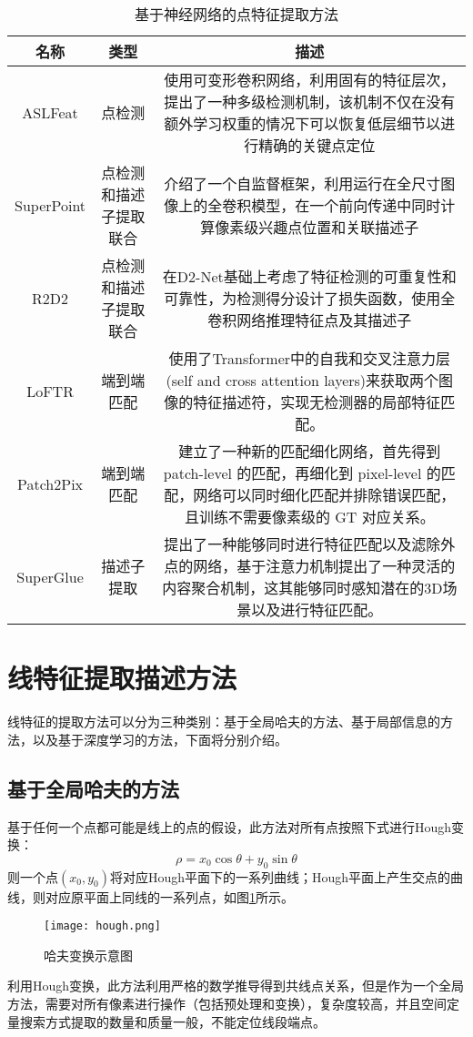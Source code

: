 \begin{table}[!ht]
  \centering
  \begin{tabular}{|c|c|c|}
  \hline
      名称 & 类型 & 描述 \\ \hline
      ASLFeat\cite{luo2020aslfeat} & 点检测 & \parbox[c][16ex]{7cm}{使用可变形卷积网络，利用固有的特征层次，提出了一种多级检测机制，该机制不仅在没有额外学习权重的情况下可以恢复低层细节以进行精确的关键点定位} \\ \hline
      SuperPoint\cite{detone2018superpoint} & 点检测和描述子提取联合 & \parbox[c][13ex]{7cm}{介绍了一个自监督框架，利用运行在全尺寸图像上的全卷积模型，在一个前向传递中同时计算像素级兴趣点位置和关联描述子} \\ \hline
      R2D2\cite{revaud2019r2d2} & 点检测和描述子提取联合 & \parbox[c][13ex]{7cm}{在D2-Net基础上考虑了特征检测的可重复性和可靠性，为检测得分设计了损失函数，使用全卷积网络推理特征点及其描述子} \\ \hline
      LoFTR\cite{sun2021loftr} & 端到端匹配 &\parbox[c][13ex]{7cm}{ 使用了Transformer中的自我和交叉注意力层(self and cross attention layers)来获取两个图像的特征描述符，实现无检测器的局部特征匹配。} \\ \hline
      Patch2Pix\cite{zhou2021patch2pix} & 端到端匹配 & \parbox[c][16ex]{7cm}{建立了一种新的匹配细化网络，首先得到 patch-level 的匹配，再细化到 pixel-level 的匹配，网络可以同时细化匹配并排除错误匹配，且训练不需要像素级的 GT 对应关系。} \\ \hline
      SuperGlue\cite{sarlin2020superglue} & 描述子提取 & \parbox[c][16ex]{7cm}{提出了一种能够同时进行特征匹配以及滤除外点的网络，基于注意力机制提出了一种灵活的内容聚合机制，这其能够同时感知潜在的3D场景以及进行特征匹配。} \\ \hline
  \end{tabular}
  \caption{基于神经网络的点特征提取方法}
  \label{tab_NNPoint}
\end{table}

\section{线特征提取描述方法}
线特征的提取方法可以分为三种类别：基于全局哈夫的方法、基于局部信息的方法，以及基于深度学习的方法，下面将分别介绍。
\subsection{基于全局哈夫的方法}
基于任何一个点都可能是线上的点的假设，此方法对所有点按照下式进行Hough变换：
\[
  \rho = x_0\cos{\theta}+y_0\sin{\theta}
\]
则一个点$(x_0,y_0)$将对应Hough平面下的一系列曲线；Hough平面上产生交点的曲线，则对应原平面上同线的一系列点，如图\ref{fig_hough}所示。
\begin{figure}
  \centering
  \texttt{[image: hough.png]}
  \caption{哈夫变换示意图}
  \label{fig_hough}
\end{figure}
利用Hough变换，此方法利用严格的数学推导得到共线点关系，但是作为一个全局方法，需要对所有像素进行操作（包括预处理和变换），复杂度较高，并且空间定量搜索方式提取的数量和质量一般，不能定位线段端点。

